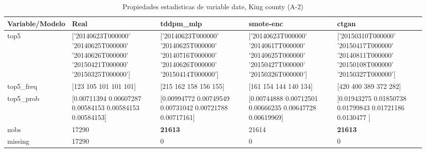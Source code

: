 \begin{table}[H]
\centering
\fontsize{8}{14}\selectfont
\caption{Propiedades  estadisticas de variable date, King county (A-2)}
\label{table-stats-king county-a-2-date}
\begin{tabular}{|l|m{10em}|m{10em}|m{10em}|m{10em}|}
\hline
 \rowcolor[gray]{0.8}
Variable/Modelo & Real & tddpm\_mlp & smote-enc & ctgan \\
\hline top5 & ['20140623T000000' '20140625T000000' '20140626T000000' '20150421T000000'
 '20150325T000000'] & ['20140623T000000' '20140625T000000' '20140716T000000' '20140626T000000'
 '20150414T000000'] & ['20140623T000000' '20140617T000000' '20140625T000000' '20150427T000000'
 '20150326T000000'] & ['20150310T000000' '20150417T000000' '20140811T000000' '20150108T000000'
 '20150327T000000'] \\
\hline top5\_freq & [123 105 101 101 101] & [215 162 158 156 155] & [161 154 144 140 134] & [420 400 389 372 282] \\
\hline top5\_prob & [0.00711394 0.00607287 0.00584153 0.00584153 0.00584153] & [0.00994772 0.00749549 0.00731042 0.00721788 0.00717161] & [0.00744888 0.00712501 0.00666235 0.00647728 0.00619969] & [0.01943275 0.01850738 0.01799843 0.01721186 0.0130477 ] \\
\hline nobs & 17290 & \bfseries 21613 & \cellcolor[rgb]{0.9, 0.54, 0.52} 21614 & \bfseries 21613 \\
\hline missing & 17290 & 0 & 0 & 0 \\
\hline
\end{tabular}
\end{table}
